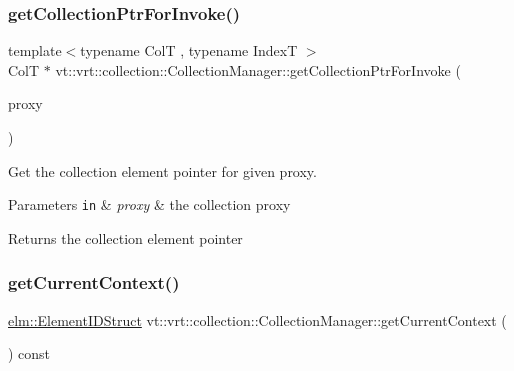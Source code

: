 \subsubsection{\texorpdfstring{get\+Collection\+Ptr\+For\+Invoke()}{getCollectionPtrForInvoke()}}
{\footnotesize\ttfamily template$<$typename ColT , typename IndexT $>$ \\
ColT $\ast$ vt\+::vrt\+::collection\+::\+Collection\+Manager\+::get\+Collection\+Ptr\+For\+Invoke (\begin{DoxyParamCaption}\item[{\hyperlink{namespacevt_1_1vrt_a620a5c8c59d13e513f690c74b4af516f}{Virtual\+Elm\+Proxy\+Type}$<$ ColT $>$ const \&}]{proxy }\end{DoxyParamCaption})\hspace{0.3cm}{\ttfamily [private]}}



Get the collection element pointer for given proxy. 


\begin{DoxyParams}[1]{Parameters}
\mbox{\tt in}  & {\em proxy} & the collection proxy\\
\hline
\end{DoxyParams}
\begin{DoxyReturn}{Returns}
the collection element pointer 
\end{DoxyReturn}
\mbox{\label{structvt_1_1vrt_1_1collection_1_1_collection_manager_aeb9f3e6a1411d77d0a9d87df97fc9e37}} 
\subsubsection{\texorpdfstring{get\+Current\+Context()}{getCurrentContext()}}
{\footnotesize\ttfamily \hyperlink{structvt_1_1elm_1_1_element_i_d_struct}{elm\+::\+Element\+I\+D\+Struct} vt\+::vrt\+::collection\+::\+Collection\+Manager\+::get\+Current\+Context (\begin{DoxyParamCaption}{ }\end{DoxyParamCaption}) const\hspace{0.3cm}{\ttfamily [private]}}



